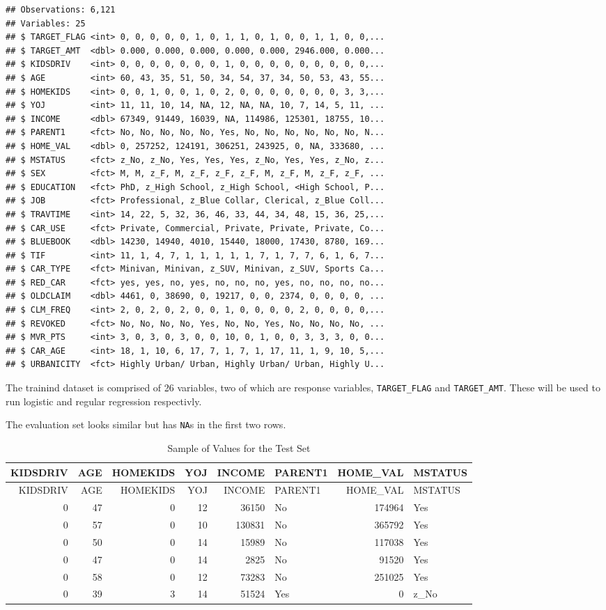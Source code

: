 \documentclass[]{article}
\begin{document}
\begin{verbatim}
## Observations: 6,121
## Variables: 25
## $ TARGET_FLAG <int> 0, 0, 0, 0, 0, 1, 0, 1, 1, 0, 1, 0, 0, 1, 1, 0, 0,...
## $ TARGET_AMT  <dbl> 0.000, 0.000, 0.000, 0.000, 0.000, 2946.000, 0.000...
## $ KIDSDRIV    <int> 0, 0, 0, 0, 0, 0, 0, 1, 0, 0, 0, 0, 0, 0, 0, 0, 0,...
## $ AGE         <int> 60, 43, 35, 51, 50, 34, 54, 37, 34, 50, 53, 43, 55...
## $ HOMEKIDS    <int> 0, 0, 1, 0, 0, 1, 0, 2, 0, 0, 0, 0, 0, 0, 0, 3, 3,...
## $ YOJ         <int> 11, 11, 10, 14, NA, 12, NA, NA, 10, 7, 14, 5, 11, ...
## $ INCOME      <dbl> 67349, 91449, 16039, NA, 114986, 125301, 18755, 10...
## $ PARENT1     <fct> No, No, No, No, No, Yes, No, No, No, No, No, No, N...
## $ HOME_VAL    <dbl> 0, 257252, 124191, 306251, 243925, 0, NA, 333680, ...
## $ MSTATUS     <fct> z_No, z_No, Yes, Yes, Yes, z_No, Yes, Yes, z_No, z...
## $ SEX         <fct> M, M, z_F, M, z_F, z_F, z_F, M, z_F, M, z_F, z_F, ...
## $ EDUCATION   <fct> PhD, z_High School, z_High School, <High School, P...
## $ JOB         <fct> Professional, z_Blue Collar, Clerical, z_Blue Coll...
## $ TRAVTIME    <int> 14, 22, 5, 32, 36, 46, 33, 44, 34, 48, 15, 36, 25,...
## $ CAR_USE     <fct> Private, Commercial, Private, Private, Private, Co...
## $ BLUEBOOK    <dbl> 14230, 14940, 4010, 15440, 18000, 17430, 8780, 169...
## $ TIF         <int> 11, 1, 4, 7, 1, 1, 1, 1, 1, 7, 1, 7, 7, 6, 1, 6, 7...
## $ CAR_TYPE    <fct> Minivan, Minivan, z_SUV, Minivan, z_SUV, Sports Ca...
## $ RED_CAR     <fct> yes, yes, no, yes, no, no, no, yes, no, no, no, no...
## $ OLDCLAIM    <dbl> 4461, 0, 38690, 0, 19217, 0, 0, 2374, 0, 0, 0, 0, ...
## $ CLM_FREQ    <int> 2, 0, 2, 0, 2, 0, 0, 1, 0, 0, 0, 0, 2, 0, 0, 0, 0,...
## $ REVOKED     <fct> No, No, No, No, Yes, No, No, Yes, No, No, No, No, ...
## $ MVR_PTS     <int> 3, 0, 3, 0, 3, 0, 0, 10, 0, 1, 0, 0, 3, 3, 3, 0, 0...
## $ CAR_AGE     <int> 18, 1, 10, 6, 17, 7, 1, 7, 1, 17, 11, 1, 9, 10, 5,...
## $ URBANICITY  <fct> Highly Urban/ Urban, Highly Urban/ Urban, Highly U...
\end{verbatim}

The trainind dataset is comprised of 26 variables, two of which are
response variables, \texttt{TARGET\_FLAG} and \texttt{TARGET\_AMT}.
These will be used to run logistic and regular regression respectivly.

The evaluation set looks similar but has \texttt{NA}s in the first two
rows.

\begin{longtable}[]{@{}rrrrrlrl@{}}
\caption{Sample of Values for the Test Set}\tabularnewline
\toprule
KIDSDRIV & AGE & HOMEKIDS & YOJ & INCOME & PARENT1 & HOME\_VAL &
MSTATUS\tabularnewline
\midrule
\endfirsthead
\toprule
KIDSDRIV & AGE & HOMEKIDS & YOJ & INCOME & PARENT1 & HOME\_VAL &
MSTATUS\tabularnewline
\midrule
\endhead
0 & 47 & 0 & 12 & 36150 & No & 174964 & Yes\tabularnewline
0 & 57 & 0 & 10 & 130831 & No & 365792 & Yes\tabularnewline
0 & 50 & 0 & 14 & 15989 & No & 117038 & Yes\tabularnewline
0 & 47 & 0 & 14 & 2825 & No & 91520 & Yes\tabularnewline
0 & 58 & 0 & 12 & 73283 & No & 251025 & Yes\tabularnewline
0 & 39 & 3 & 14 & 51524 & Yes & 0 & z\_No\tabularnewline
\bottomrule
\end{longtable}
\end{document}
